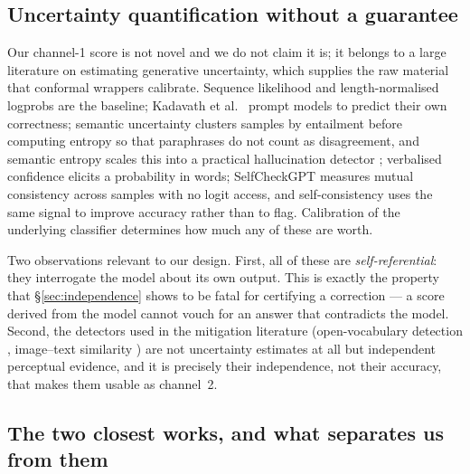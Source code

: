 \documentclass[review,number,doubleblind]{elsarticle}
\theoremstyle{plain}
\theoremstyle{definition}
\theoremstyle{remark}
\begin{document}
\subsection{Uncertainty quantification without a guarantee}
\label{sec:rel:uq}

Our channel-1 score is not novel and we do not claim it is; it belongs to a large
literature on estimating generative uncertainty, which supplies the raw material that
conformal wrappers calibrate. Sequence likelihood and length-normalised logprobs are the
baseline; Kadavath et al.~\cite{kadavath2022} prompt models to predict their own correctness; semantic
uncertainty \citep{kuhn2023} clusters samples by entailment before computing entropy so that
paraphrases do not count as disagreement, and semantic entropy scales this into a practical
hallucination detector \citep{farquhar2024}; verbalised confidence \citep{lin2022} elicits a
probability in words; SelfCheckGPT \citep{manakul2023} measures mutual consistency across
samples with no logit access, and self-consistency \citep{wang2023selfconsistency} uses the
same signal to improve accuracy rather than to flag. Calibration of the underlying classifier
\citep{guo2017} determines how much any of these are worth.

Two observations relevant to our design. First, all of these are \emph{self-referential}:
they interrogate the model about its own output. This is exactly the property that
\S\ref{sec:independence} shows to be fatal for certifying a correction --- a score
derived from the model cannot vouch for an answer that contradicts the model. Second, the
detectors used in the mitigation literature (open-vocabulary detection
\citep{owlv2,liu2024groundingdino}, image--text similarity \citep{clip}) are not
uncertainty estimates at all but independent perceptual evidence, and it is precisely their
independence, not their accuracy, that makes them usable as channel~2.

\subsection{The two closest works, and what separates us from them}
\label{sec:rel:position}
\end{document}
